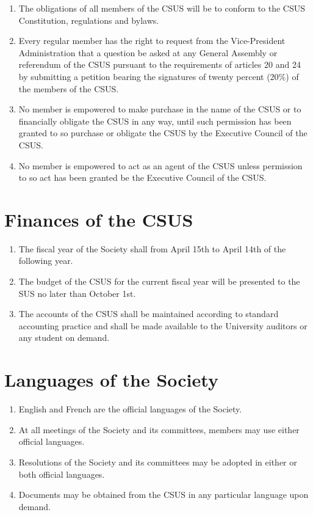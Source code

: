 \begin{enumerate}
\def\labelenumi{\arabic{enumi}.}
\setcounter{enumi}{2}
\item
  The obligations of all members of the CSUS will be to conform to the
  CSUS Constitution, regulations and bylaws.
\item
  Every regular member has the right to request from the Vice-President
  Administration that a question be asked at any General Assembly or
  referendum of the CSUS pursuant to the requirements of articles 20 and
  24 by submitting a petition bearing the signatures of twenty percent
  (20\%) of the members of the CSUS.
\item
  No member is empowered to make purchase in the name of the CSUS or to
  financially obligate the CSUS in any way, until such permission has
  been granted to so purchase or obligate the CSUS by the Executive
  Council of the CSUS.
\item
  No member is empowered to act as an agent of the CSUS unless
  permission to so act has been granted be the Executive Council of the
  CSUS.
\end{enumerate}

\section{Finances of the CSUS}\label{finances-of-the-csus}

\begin{enumerate}
\def\labelenumi{\arabic{enumi}.}
\item
  The fiscal year of the Society shall from April 15th to April 14th of
  the following year.
\item
  The budget of the CSUS for the current fiscal year will be presented
  to the SUS no later than October 1st.
\item
  The accounts of the CSUS shall be maintained according to standard
  accounting practice and shall be made available to the University
  auditors or any student on demand.
\end{enumerate}

\section{Languages of the
Society}\label{languages-of-the-society}

\begin{enumerate}
\def\labelenumi{\arabic{enumi}.}
\item
  English and French are the official languages of the Society.
\item
  At all meetings of the Society and its committees, members may use
  either official languages.
\item
  Resolutions of the Society and its committees may be adopted in either
  or both official languages.
\item
  Documents may be obtained from the CSUS in any particular language
  upon demand.
\end{enumerate}

